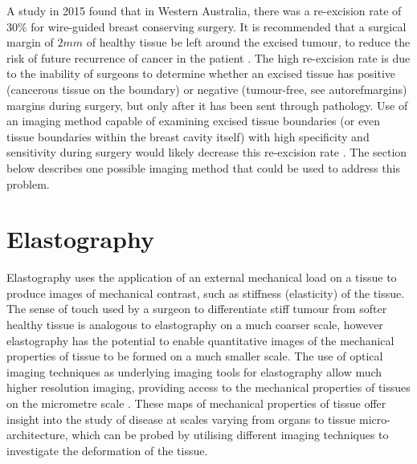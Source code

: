 A study in 2015 \cite{ballal_predictors_2015} found that in Western Australia, there was a re-excision rate of 30\% for wire-guided breast conserving surgery. It is recommended that a surgical margin of $2mm$ of healthy tissue be left around the excised tumour, to reduce the risk of future recurrence of cancer in the patient \cite{behm_surgical_2013}. The high re-excision rate is due to the inability of surgeons to determine whether an excised tissue has positive (cancerous tissue on the boundary) or negative (tumour-free, see autoref{margins}) margins during surgery, but only after it has been sent through pathology. Use of an imaging method capable of examining excised tissue boundaries (or even tissue boundaries within the breast cavity itself) with high specificity and sensitivity during surgery would likely decrease this re-excision rate \cite{ballal_predictors_2015}. The section below describes one possible imaging method that could be used to address this problem. 

\section{Elastography}\label{elastography}
Elastography uses the application of an external mechanical load on a tissue to produce images of mechanical contrast, such as stiffness (elasticity) of the tissue. The sense of touch used by a surgeon to differentiate stiff tumour from softer healthy tissue is analogous to elastography on a much coarser scale, however elastography has the potential to enable quantitative images of the mechanical properties of tissue to be formed on a much smaller scale. The use of optical imaging techniques as underlying imaging tools for elastography allow much higher resolution imaging, providing access to the mechanical properties of tissues on the micrometre scale \cite{schmitt_oct_1998} \cite{kennedy_review_2014}.
These maps of mechanical properties of tissue offer insight into the study of disease at scales varying from organs to tissue micro-architecture, which can be probed by utilising different imaging techniques to investigate the deformation of the tissue.

